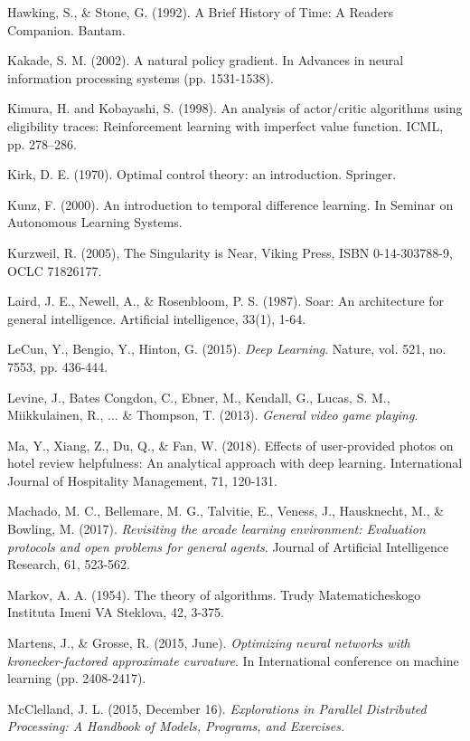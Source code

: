 \begin{thebibliography}{99}
\bibitem{} Hawking, S., \& Stone, G. (1992). A Brief History of Time: A Readers Companion. Bantam.

\bibitem{} Kakade, S. M. (2002). A natural policy gradient. In Advances in neural information processing systems (pp. 1531-1538).

\bibitem{} Kimura, H. and Kobayashi, S. (1998). An analysis of actor/critic algorithms using eligibility traces:
Reinforcement learning with imperfect value function. ICML, pp. 278–286.

\bibitem{} Kirk, D. E. (1970). Optimal control theory: an introduction. Springer.

\bibitem{} Kunz, F. (2000). An introduction to temporal difference learning. In Seminar on Autonomous Learning Systems.

\bibitem{} Kurzweil, R. (2005), The Singularity is Near, Viking Press, ISBN 0-14-303788-9, OCLC 71826177.

\bibitem{} Laird, J. E., Newell, A., \& Rosenbloom, P. S. (1987). Soar: An architecture for general intelligence. Artificial intelligence, 33(1), 1-64.

\bibitem{} LeCun, Y., Bengio, Y., Hinton, G. (2015). \textit{Deep Learning}. Nature, vol. 521, no. 7553, pp. 436-444.

\bibitem{} Levine, J., Bates Congdon, C., Ebner, M., Kendall, G., Lucas, S. M., Miikkulainen, R., ... \& Thompson, T. (2013). \textit{General video game playing}.

\bibitem{} Ma, Y., Xiang, Z., Du, Q., \& Fan, W. (2018). Effects of user-provided photos on hotel review
helpfulness: An analytical approach with deep learning. International Journal of Hospitality Management, 71, 120-131.

\bibitem{} Machado, M. C., Bellemare, M. G., Talvitie, E., Veness, J., Hausknecht, M., \& Bowling, M.
(2017). \textit{Revisiting the arcade learning environment: Evaluation protocols and open problems for general agents}. Journal of Artificial Intelligence Research, 61, 523-562.

\bibitem{} Markov, A. A. (1954). The theory of algorithms. Trudy Matematicheskogo Instituta Imeni VA Steklova, 42, 3-375.

\bibitem{} Martens, J., \& Grosse, R. (2015, June). \textit{Optimizing neural networks with kronecker-factored approximate curvature}. In International conference on machine learning (pp. 2408-2417).

\bibitem{} McClelland, J. L. (2015, December 16).\textit{ Explorations in Parallel Distributed Processing: A
Handbook of Models, Programs, and Exercises.}


\end{thebibliography}
